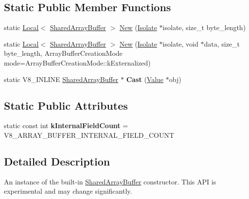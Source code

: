 \subsection*{Static Public Member Functions}
\begin{DoxyCompactItemize}
\item 
static \mbox{\hyperlink{classv8_1_1Local}{Local}}$<$ \mbox{\hyperlink{classv8_1_1SharedArrayBuffer}{Shared\+Array\+Buffer}} $>$ \mbox{\hyperlink{classv8_1_1SharedArrayBuffer_a0e7060cc31105c5bf780d770c1a7acc6}{New}} (\mbox{\hyperlink{classv8_1_1Isolate}{Isolate}} $\ast$isolate, size\+\_\+t byte\+\_\+length)
\item 
static \mbox{\hyperlink{classv8_1_1Local}{Local}}$<$ \mbox{\hyperlink{classv8_1_1SharedArrayBuffer}{Shared\+Array\+Buffer}} $>$ \mbox{\hyperlink{classv8_1_1SharedArrayBuffer_af708b1765380ad42b7d572dfc531c21c}{New}} (\mbox{\hyperlink{classv8_1_1Isolate}{Isolate}} $\ast$isolate, void $\ast$data, size\+\_\+t byte\+\_\+length, Array\+Buffer\+Creation\+Mode mode=Array\+Buffer\+Creation\+Mode\+::k\+Externalized)
\item 
\mbox{\label{classv8_1_1SharedArrayBuffer_ac4e1ba5d4564c7033814f4cc45fdda84}} 
static V8\+\_\+\+I\+N\+L\+I\+NE \mbox{\hyperlink{classv8_1_1SharedArrayBuffer}{Shared\+Array\+Buffer}} $\ast$ {\bfseries Cast} (\mbox{\hyperlink{classv8_1_1Value}{Value}} $\ast$obj)
\end{DoxyCompactItemize}
\subsection*{Static Public Attributes}
\begin{DoxyCompactItemize}
\item 
\mbox{\label{classv8_1_1SharedArrayBuffer_a6f47f6b441e37aefd1a9d0176e8a3da8}} 
static const int {\bfseries k\+Internal\+Field\+Count} = V8\+\_\+\+A\+R\+R\+A\+Y\+\_\+\+B\+U\+F\+F\+E\+R\+\_\+\+I\+N\+T\+E\+R\+N\+A\+L\+\_\+\+F\+I\+E\+L\+D\+\_\+\+C\+O\+U\+NT
\end{DoxyCompactItemize}


\subsection{Detailed Description}
An instance of the built-\/in \mbox{\hyperlink{classv8_1_1SharedArrayBuffer}{Shared\+Array\+Buffer}} constructor. This A\+PI is experimental and may change significantly. 

